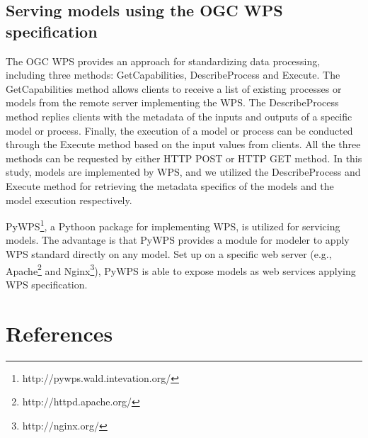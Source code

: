\documentclass[review]{elsarticle}
\begin{document}
\subsection{Serving models using the OGC WPS specification} The OGC WPS provides an approach for standardizing data processing, including three methods: GetCapabilities, DescribeProcess and Execute. The GetCapabilities method allows clients to receive a list of existing processes or models from the remote server implementing the WPS. The DescribeProcess method replies clients with the metadata of the inputs and outputs of a specific model or process. Finally, the execution of a model or process can be conducted through the Execute method based on the input values from clients. All the three methods can be requested by either HTTP POST or HTTP GET method. In this study, models are implemented by WPS, and we utilized the DescribeProcess and Execute method for retrieving the metadata specifics of the models and the model execution respectively.

PyWPS\footnote{http://pywps.wald.intevation.org/}, a Pythoon package for implementing WPS, is utilized for servicing models. The advantage is that PyWPS provides a module for modeler to apply WPS standard directly on any model. Set up on a specific web server (e.g., Apache\footnote{http://httpd.apache.org/} and Nginx\footnote{http://nginx.org/}), PyWPS is able to expose models as web services applying WPS specification.


\section*{References}


\end{document}
